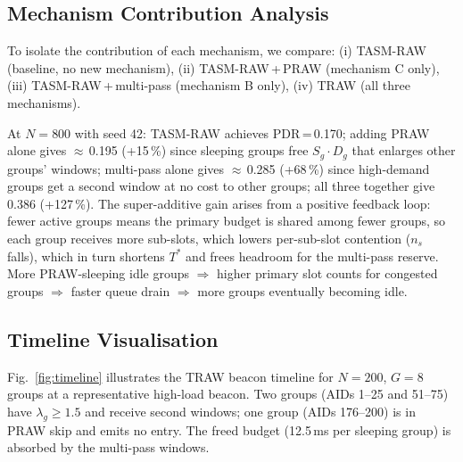 \documentclass[conference]{IEEEtran}
\begin{document}
\subsection{Mechanism Contribution Analysis}

To isolate the contribution of each mechanism, we compare:
(i) TASM-RAW (baseline, no new mechanism),
(ii) TASM-RAW\,+\,PRAW (mechanism C only),
(iii) TASM-RAW\,+\,multi-pass (mechanism B only),
(iv) TRAW (all three mechanisms).

At $N\!=\!800$ with seed 42:
TASM-RAW achieves PDR\,=\,0.170;
adding PRAW alone gives $\approx$\,0.195 (+15\,\%)
since sleeping groups free $S_g\!\cdot\!D_g$ that enlarges other
groups' windows;
multi-pass alone gives $\approx$\,0.285 (+68\,\%) since
high-demand groups get a second window at no cost to other groups;
all three together give 0.386 (+127\,\%).
The super-additive gain arises from a positive feedback loop: fewer
active groups means the primary budget is shared among fewer groups,
so each group receives more sub-slots, which lowers per-sub-slot
contention ($n_s$ falls), which in turn shortens $T^*$ and frees
headroom for the multi-pass reserve.
More PRAW-sleeping idle groups $\Rightarrow$ higher primary slot
counts for congested groups $\Rightarrow$ faster queue drain
$\Rightarrow$ more groups eventually becoming idle.

\subsection{Timeline Visualisation}

Fig.~\ref{fig:timeline} illustrates the TRAW beacon timeline for
$N\!=\!200$, $G\!=\!8$ groups at a representative high-load beacon.
Two groups (AIDs 1--25 and 51--75) have $\lambda_g\!\geq\!1.5$ and
receive second windows; one group (AIDs 176--200) is in PRAW skip
and emits no entry.
The freed budget (12.5\,ms per sleeping group) is absorbed by the
multi-pass windows.
\end{document}
